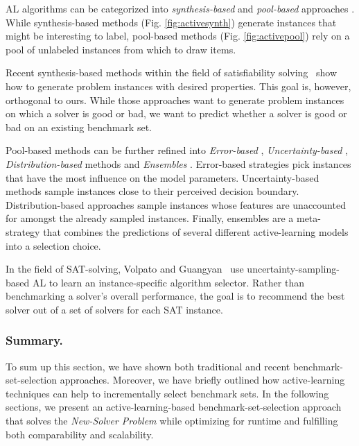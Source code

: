 \documentclass[runningheads]{llncs}
\begin{document}
AL algorithms can be categorized into \emph{synthesis-bas\-ed} \cite{0001AEMN22,GarzonMG22,2019gaal} and \emph{pool-bas\-ed} approaches \cite{GolbandiKL11,HarpaleY08,KorenBV09}.%
While synthesis-based methods (Fig. \ref{fig:activesynth}) generate instances that might be interesting to label, pool-based methods (Fig. \ref{fig:activepool}) rely on a pool of unlabeled instances from which to draw items.

Recent synthesis-based methods within the field of satisfiability solving~\cite{0001AEMN22,GarzonMG22} show how to generate problem instances with desired properties.
This goal is, however, orthogonal to ours.
While those approaches want to generate problem instances on which a solver is good or bad, we want to predict whether a solver is good or bad on an existing benchmark set.

Pool-based methods can be further refined into \emph{Error-based} \cite{GolbandiKL11,KorenBV09}, \emph{Un\-cer\-tain\-ty-based} \cite{HarpaleY08,KapoorGUD07,TongK01}, \emph{Distribution-based} methods \cite{distribAL,SinhaED19} and \emph{Ensembles} \cite{KornerW06,MelvilleM04}.
Error-based strategies pick instances that have the most influence on the model parameters.
Uncertainty-based methods sample instances close to their perceived decision boundary.
Distribution-based approaches sample instances whose features are unaccounted for amongst the already sampled instances.
Finally, ensembles are a meta-strategy that combines the predictions of several different active-learning models into a selection choice.

In the field of SAT-solving, Volpato and Guangyan~\cite{volpato2019active} use uncertainty-sampling-based AL to learn an instance-specific algorithm selector.
Rather than benchmarking a solver's overall performance, the goal is to recommend the best solver out of a set of solvers for each SAT instance.

\subsubsection{Summary.}
To sum up this section, we have shown both traditional and recent benchmark-set-selection approaches.
Moreover, we have briefly outlined how active-learning techniques can help to incrementally select benchmark sets.
In the following sections, we present an active-learning-based benchmark-set-selection approach that solves the \emph{New-Solver Problem} while optimizing for runtime and fulfilling both comparability and scalability.
\end{document}
